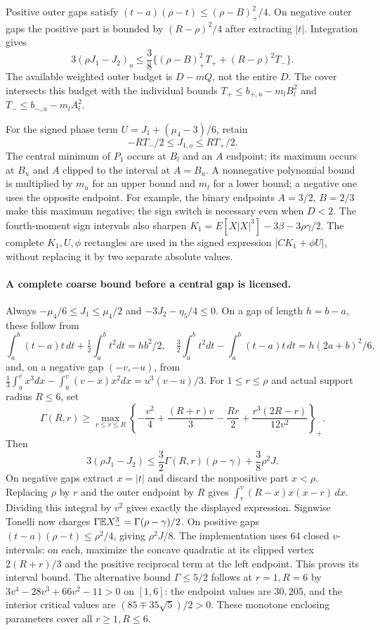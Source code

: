 Positive outer gaps satisfy
$(t-a)(\rho-t)\le(\rho-B)_+^2/4$. On negative outer gaps the positive
part is bounded by $(R-\rho)^2/4$ after extracting $|t|$.
Integration gives
\[
 3(\rho J_1-J_2)_o
 \le\frac38\{(\rho-B)_+^2T_++(R-\rho)^2T_-\}.
\]
The available weighted outer budget is $D-mQ$, not the entire $D$.
The cover intersects this budget with the individual bounds
$T_+\le b_{+,u}-m_lB_l^2$ and $T_-\le b_{-,u}-m_lA_l^2$.

For the signed phase term $U=J_1+(\mu_4-3)/6$, retain
\[
 -RT_-/2\le J_{1,o}\le RT_+/2.
\]
The central minimum of $P_1$ occurs at $B_l$ and an $A$ endpoint;
its maximum occurs at $B_u$ and $A$ clipped to the interval at $A=B_u$.
A nonnegative polynomial bound is multiplied by $m_u$ for an upper
bound and $m_l$ for a lower bound; a negative one uses the opposite
endpoint. For example, the binary endpoints $A=3/2$, $B=2/3$ make this
maximum negative; the sign switch is necessary even when $D<2$.
The fourth-moment sign intervals also sharpen
$K_1=E[X|X|^3]-3\beta-3\rho\gamma/2$.
The complete $K_1,U,\phi$ rectangles are used in the signed expression
$|CK_1+\phi U|$, without replacing it by two separate absolute values.


\paragraph{A complete coarse bound before a central gap is licensed.}
Always $-\mu_4/6\le J_1\le\mu_4/2$ and
$-3J_2-\eta_5/4\le0$. On a gap of length $h=b-a$, these follow from
\[
 \int_a^b(t-a)t\,dt+\tfrac12\int_a^bt^2dt=hb^2/2,\quad
 \tfrac32\int_a^bt^2dt-\int_a^b(t-a)t\,dt=h(2a+b)^2/6,
\]
and, on a negative gap $(-v,-u)$, from
$\tfrac13\int_u^v x^3dx-\int_u^v(v-x)x^2dx=u^3(v-u)/3$.
For $1\le r\le\rho$ and actual support radius $R\le6$, set
\[
 \Gamma(R,r)\ge\max_{r\le v\le R}
 \left\{-\frac{v^2}4+\frac{(R+r)v}3-\frac{Rr}2+
                      \frac{r^3(2R-r)}{12v^2}\right\}_+.
\]
Then
\[
 3(\rho J_1-J_2)\le\frac32\Gamma(R,r)(\rho-\gamma)
                              +\frac38\rho^2J.
\]
On negative gaps extract $x=|t|$ and discard the nonpositive part
$x<\rho$. Replacing $\rho$ by $r$ and the outer endpoint by $R$
gives $\int_r^v(R-x)x(x-r)\,dx$. Dividing this integral by $v^2$
gives exactly the displayed expression. Signwise Tonelli now charges
$\Gamma\mathbb E X_-^3=\Gamma(\rho-\gamma)/2$.
On positive gaps $(t-a)(\rho-t)\le\rho^2/4$, giving $\rho^2J/8$.
The implementation uses 64 closed $v$-intervals: on each, maximize the
concave quadratic at its clipped vertex $2(R+r)/3$ and the positive
reciprocal term at the left endpoint. This proves its interval bound.
The alternative bound $\Gamma\le5/2$ follows at $r=1,R=6$ by
$3v^4-28v^3+66v^2-11>0$ on $[1,6]$: the endpoint values are $30,205$,
and the interior critical values are $(85\mp35\sqrt5)/2>0$.
These monotone enclosing parameters cover all $r\ge1,R\le6$.
